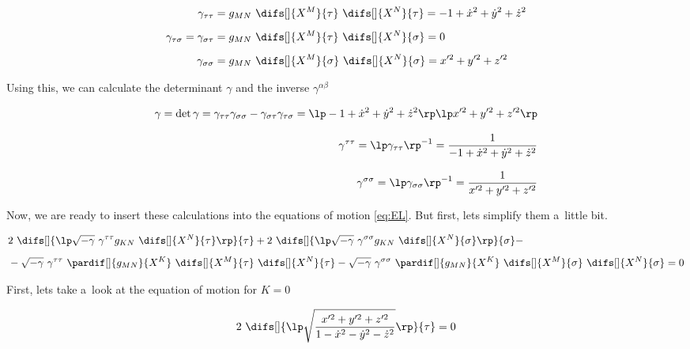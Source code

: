 \begin{align}
\label{eq:gamma_flat}
    \gamma_{\tau \tau} & = g_{M N}~ \difs[] {X^{M}} {\tau} ~ \difs[] {X^{N}} {\tau} = -1 + \dot{x}^2 + \dot{y}^2 + \dot{z}^2 \\[5pt]
    \gamma_{\tau \sigma} = \gamma_{\sigma \tau} & = g_{M N}~ \difs[] {X^{M}} {\tau} ~ \difs[] {X^{N}} {\sigma} =  0\\[5pt]
    \gamma_{\sigma \sigma} & = g_{M N}~ \difs[] {X^{M}} {\sigma} ~ \difs[] {X^{N}} {\sigma} = x^{\prime 2} + y^{\prime 2} + z^{\prime 2}
\end{align}

\noindent
Using this, we can calculate the determinant $\gamma$ and the inverse $\gamma^{\alpha \beta}$

\begin{align}
    \gamma = \det \gamma = \gamma_{\tau \tau} \gamma_{\sigma \sigma} - \gamma_{\sigma \tau} \gamma_{\tau \sigma} = \lp -1 + \dot{x}^2 + \dot{y}^2 + \dot{z}^2 \rp \lp x^{\prime 2} + y^{\prime 2} + z^{\prime 2} \rp \\[8pt]
    \gamma^{\tau \tau} = \lp \gamma_{\tau \tau} \rp^{-1} = \frac{1}{-1 + \dot{x}^2 + \dot{y}^2 + \dot{z}^2} \\[8pt]
    \gamma^{\sigma \sigma} = \lp \gamma_{\sigma \sigma} \rp^{-1} = \frac{1}{x^{\prime 2} + y^{\prime 2} + z^{\prime 2}}
\end{align}

\noindent
Now, we are ready to insert these calculations into the equations of motion \eqref{eq:EL}. But first, lets simplify them a~little bit.

\begin{equation}
\label{eq:EOM_flat}
    \begin{aligned}
        &2 ~ \difs[] {\lp \sqrt{-\gamma} ~ \gamma^{\tau \tau} g_{K N} ~ \difs[] {X^{N}} {\tau} \rp} {\tau} +
        2 ~ \difs[] {\lp \sqrt{-\gamma} ~ \gamma^{\sigma \sigma} g_{K N} ~ \difs[] {X^{N}} {\sigma} \rp} {\sigma} - \\[5pt]
        &- \sqrt{-\gamma} ~\gamma^{\tau \tau} ~ \pardif[] {g_{M N}} {X^{K}} ~ \difs[] {X^{M}} {\tau} ~ \difs[] {X^{N}} {\tau}
        - \sqrt{-\gamma} ~\gamma^{\sigma \sigma} ~ \pardif[] {g_{M N}} {X^{K}} ~ \difs[] {X^{M}} {\sigma} ~ \difs[] {X^{N}} {\sigma} = 0
    \end{aligned}
\end{equation}

\noindent
First, lets take a~look at the equation of motion for $K = 0$

\begin{equation}
    2 ~ \difs[] {\lp \sqrt{ \frac{ x^{\prime 2} + y^{\prime 2} + z^{\prime 2} }{1 - \dot{x}^2 - \dot{y}^2 - \dot{z}^2}} \rp}  {\tau} = 0
\end{equation}

